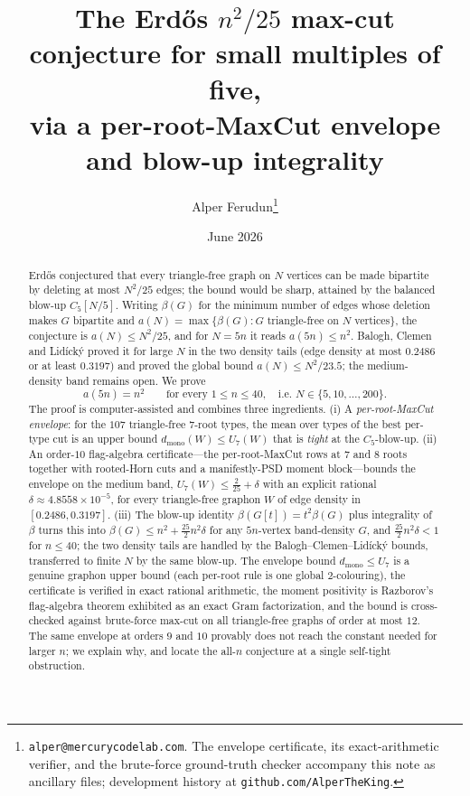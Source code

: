\documentclass[11pt]{article}
\title{The Erd\H{o}s $n^2/25$ max-cut conjecture for small multiples of five,\\
via a per-root-MaxCut envelope and blow-up integrality}
\author{Alper Ferudun\thanks{\texttt{alper@mercurycodelab.com}. The envelope
certificate, its exact-arithmetic verifier, and the brute-force ground-truth
checker accompany this note as ancillary files; development history at
\texttt{github.com/AlperTheKing}.}}
\date{June 2026}
\theoremstyle{remark}
\newcommand{\bip}{\beta}
\newcommand{\dmono}{d_{\mathrm{mono}}}
\begin{document}
\maketitle

\begin{abstract}
Erd\H{o}s conjectured that every triangle-free graph on $N$ vertices can be made
bipartite by deleting at most $N^2/25$ edges; the bound would be sharp, attained
by the balanced blow-up $C_5[N/5]$. Writing $\bip(G)$ for the minimum number of
edges whose deletion makes $G$ bipartite and $a(N)=\max\{\bip(G):G$ triangle-free
on $N$ vertices$\}$, the conjecture is $a(N)\le N^2/25$, and for $N=5n$ it reads
$a(5n)\le n^2$. Balogh, Clemen and Lid\'ick\'y proved it for large $N$ in the two
density tails (edge density at most $0.2486$ or at least $0.3197$) and proved the
global bound $a(N)\le N^2/23.5$; the medium-density band remains open. We prove
\[
a(5n)=n^2\qquad\text{for every }1\le n\le 40,\quad\text{i.e. } N\in\{5,10,\dots,200\}.
\]
The proof is computer-assisted and combines three ingredients. (i) A
\emph{per-root-MaxCut envelope}: for the $107$ triangle-free $7$-root types, the
mean over types of the best per-type cut is an upper bound
$\dmono(W)\le U_7(W)$ that is \emph{tight} at the $C_5$-blow-up. (ii) An order-$10$
flag-algebra certificate---the per-root-MaxCut rows at $7$ and $8$ roots together
with rooted-Horn cuts and a manifestly-PSD moment block---bounds the envelope on
the medium band, $U_7(W)\le \tfrac{2}{25}+\delta$ with an explicit rational
$\delta\approx 4.8558\times10^{-5}$, for every triangle-free graphon $W$ of edge
density in $[0.2486,0.3197]$. (iii) The blow-up identity $\bip(G[t])=t^2\bip(G)$ plus
integrality of $\bip$ turns this into $\bip(G)\le n^2+\tfrac{25}{2}n^2\delta$ for
any $5n$-vertex band-density $G$, and $\tfrac{25}{2}n^2\delta<1$ for $n\le 40$;
the two density tails are handled by the Balogh--Clemen--Lid\'ick\'y bounds,
transferred to finite $N$ by the same blow-up. The envelope bound $\dmono\le U_7$
is a genuine graphon upper bound (each per-root rule is one global $2$-colouring),
the certificate is verified in exact rational arithmetic, the moment positivity is
Razborov's flag-algebra theorem exhibited as an exact Gram factorization, and the
bound is cross-checked against brute-force max-cut on all triangle-free graphs of
order at most $12$. The same envelope at orders $9$ and $10$ provably does not
reach the constant needed for larger $n$; we explain why, and locate the all-$n$
conjecture at a single self-tight obstruction.
\end{abstract}
\end{document}
